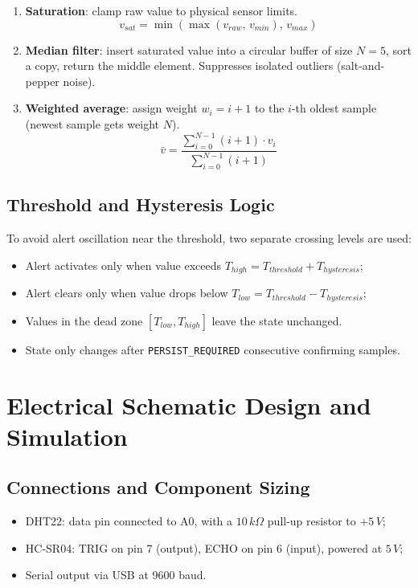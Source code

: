\documentclass[12pt,a4paper]{article}
\begin{document}
\begin{enumerate}
    \item \textbf{Saturation}: clamp raw value to physical sensor limits.
    \[
        v_{sat} = \min(\max(v_{raw},\, v_{min}),\, v_{max})
    \]

    \item \textbf{Median filter}: insert saturated value into a circular buffer of size $N=5$,
    sort a copy, return the middle element. Suppresses isolated outliers (salt-and-pepper noise).

    \item \textbf{Weighted average}: assign weight $w_i = i+1$ to the $i$-th oldest sample
    (newest sample gets weight $N$).
    \[
        \bar{v} = \frac{\sum_{i=0}^{N-1}(i+1)\cdot v_i}{\sum_{i=0}^{N-1}(i+1)}
    \]
\end{enumerate}

\subsection{Threshold and Hysteresis Logic}
To avoid alert oscillation near the threshold, two separate crossing levels are used:

\begin{itemize}
    \item Alert activates only when value exceeds $T_{high} = T_{threshold} + T_{hysteresis}$;
    \item Alert clears only when value drops below $T_{low} = T_{threshold} - T_{hysteresis}$;
    \item Values in the dead zone $[T_{low}, T_{high}]$ leave the state unchanged.
    \item State only changes after \texttt{PERSIST\_REQUIRED} consecutive confirming samples.
\end{itemize}

\section{Electrical Schematic Design and Simulation}

\subsection{Connections and Component Sizing}
\begin{itemize}
    \item DHT22: data pin connected to A0, with a $10\,k\Omega$ pull-up resistor to $+5\,V$;
    \item HC-SR04: TRIG on pin 7 (output), ECHO on pin 6 (input), powered at $5\,V$;
    \item Serial output via USB at 9600 baud.
\end{itemize}
\end{document}
